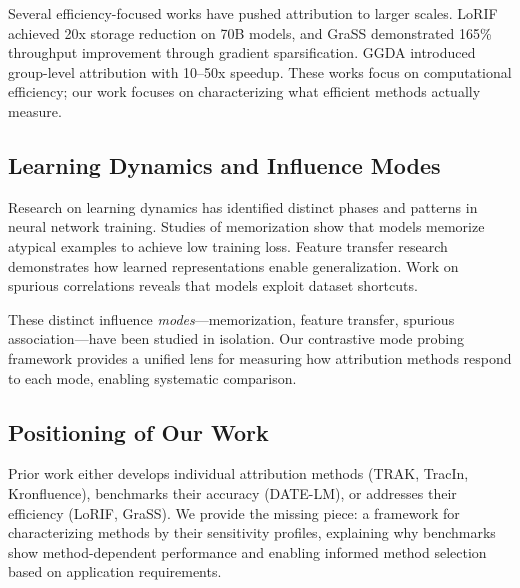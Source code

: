 Several efficiency-focused works have pushed attribution to larger scales. LoRIF \cite{li2026lorif} achieved 20x storage reduction on 70B models, and GraSS \cite{hu2025grass} demonstrated 165\% throughput improvement through gradient sparsification. GGDA \cite{ley2024ggda} introduced group-level attribution with 10--50x speedup. These works focus on computational efficiency; our work focuses on characterizing what efficient methods actually measure.

\subsection{Learning Dynamics and Influence Modes}

Research on learning dynamics has identified distinct phases and patterns in neural network training. Studies of memorization \cite{feldman2020does} show that models memorize atypical examples to achieve low training loss. Feature transfer research demonstrates how learned representations enable generalization. Work on spurious correlations \cite{sagawa2020distributionally} reveals that models exploit dataset shortcuts.

These distinct influence \emph{modes}---memorization, feature transfer, spurious association---have been studied in isolation. Our contrastive mode probing framework provides a unified lens for measuring how attribution methods respond to each mode, enabling systematic comparison.

\subsection{Positioning of Our Work}

Prior work either develops individual attribution methods (TRAK, TracIn, Kronfluence), benchmarks their accuracy (DATE-LM), or addresses their efficiency (LoRIF, GraSS). We provide the missing piece: a framework for characterizing methods by their sensitivity profiles, explaining why benchmarks show method-dependent performance and enabling informed method selection based on application requirements.
